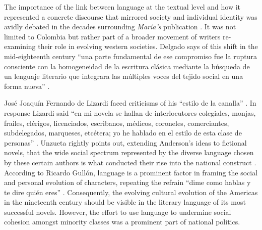 \documentclass[12pt]{report}
\begin{document}
The importance of the link between language at the textual level and how it represented a concrete discourse that mirrored society and individual identity was avidly debated in the decades surrounding \textit{María's} publication \autocite[4]{Delgado2000}.
It was not limited to Colombia but rather part of a broader movement of writers re-examining their role in evolving western societies.
Delgado says of this shift in the mid-eighteenth century \enquote{una parte fundamental de ese compromiso fue la ruptura consciente con la homogeneidad de la escritura clásica mediante la búsqueda de un lenguaje literario que integrara las múltiples voces del tejido social en una forma nueva} \autocite[11]{Delgado2000}.

José Joaquín Fernando de Lizardi faced criticisms of his \enquote{estilo de la canalla} \autocite[144]{Unzueta2003}.
In response Lizardi said \enquote{en mi novela se hallan de interlocutores colegiales, monjas, frailes, clérigos, licenciados, escribanos, médicos, coroneles, comerciantes, subdelegados, marqueses, etcétera; yo he hablado en el estilo de esta clase de personas} \autocite[144]{Unzueta2003}.
Unzueta rightly points out, extending Anderson's ideas to fictional novels, that the wide social spectrum represented by the diverse language chosen by these certain authors is what conducted their rise into the national construct \autocite[144]{Unzueta2003}.
According to Ricardo Gullón, language is a prominent factor in framing the social and personal evolution of characters, repeating the refrain \enquote{dime como hablas y te dire quién eres} \autocite[11]{Delgado2000}.
Consequently, the evolving cultural evolution of the Americas in the nineteenth century should be visible in the literary language of its most successful novels.
However, the effort to use language to undermine social cohesion amongst minority classes was a prominent part of national politics.
\end{document}
